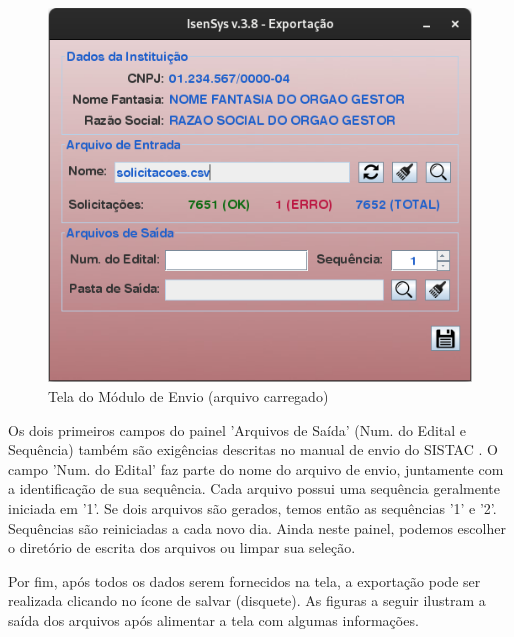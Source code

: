 \documentclass[
	12pt,			%
	openright,		%
	oneside,	
	a4paper,		%
	english,		%
	brazil			%
]{abntex2/abntex2}  %
\begin{document}
				\begin{figure}[ht]
					\begin{center}
						
						\caption{Tela do Módulo de Envio (arquivo carregado)}
						\label{envio-ui-loaded}
						
						\includegraphics[scale=0.5]{img/envio-ui-loaded}
						
					\end{center}
				\end{figure}
	
				Os dois primeiros campos do painel 'Arquivos de Saída' (Num. do Edital e Sequência) também são exigências descritas no manual de envio do SISTAC \cite{sistac-formatos}. O campo 'Num. do Edital' faz parte do nome do arquivo de envio, juntamente com a identificação de sua sequência. Cada arquivo possui uma sequência geralmente iniciada em '1'. Se dois arquivos são gerados, temos então as sequências '1' e '2'. Sequências são reiniciadas a cada novo dia. Ainda neste painel, podemos escolher o diretório de escrita dos arquivos ou limpar sua seleção.

				Por fim, após todos os dados serem fornecidos na tela, a exportação pode ser realizada clicando no ícone de salvar (disquete). As figuras a seguir ilustram a saída dos arquivos após alimentar a tela com algumas informações.
\end{document}
